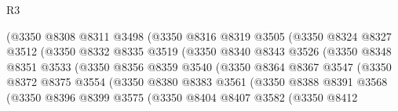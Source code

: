 \begin{lexlean}{R3}
\begin{coremodule}
                            (@3350
                              @8308
                              @8311
                              @3498
                              (@3350
                                @8316
                                @8319
                                @3505
                                (@3350
                                  @8324
                                  @8327
                                  @3512
                                  (@3350
                                    @8332
                                    @8335
                                    @3519
                                    (@3350
                                      @8340
                                      @8343
                                      @3526
                                      (@3350
                                        @8348
                                        @8351
                                        @3533
                                        (@3350
                                          @8356
                                          @8359
                                          @3540
                                          (@3350
                                            @8364
                                            @8367
                                            @3547
                                            (@3350
                                              @8372
                                              @8375
                                              @3554
                                              (@3350
                                                @8380
                                                @8383
                                                @3561
                                                (@3350
                                                  @8388
                                                  @8391
                                                  @3568
                                                  (@3350
                                                    @8396
                                                    @8399
                                                    @3575
                                                    (@3350
                                                      @8404
                                                      @8407
                                                      @3582
                                                      (@3350
                                                        @8412

\end{coremodule}
\end{lexlean}
